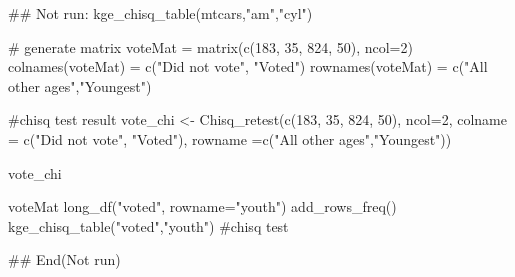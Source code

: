 \documentclass[a4paper]{book}
\begin{document}
%
\begin{Examples}
\begin{ExampleCode}

\#\# Not run: 
kge_chisq_table(mtcars,"am","cyl")

# generate matrix
voteMat = matrix(c(183, 35, 824, 50), ncol=2)
colnames(voteMat) = c("Did not vote", "Voted")
rownames(voteMat) = c("All other ages","Youngest")

#chisq test result
vote_chi <- Chisq_retest(c(183, 35, 824, 50), ncol=2,
                        colname = c("Did not vote", "Voted"),
                         rowname =c("All other ages","Youngest"))

vote_chi

voteMat%
  long_df("voted", rowname="youth")%
  add_rows_freq() %
  kge_chisq_table("voted","youth")    #chisq test


## End(Not run)
\end{ExampleCode}
\end{Examples}
\end{document}
